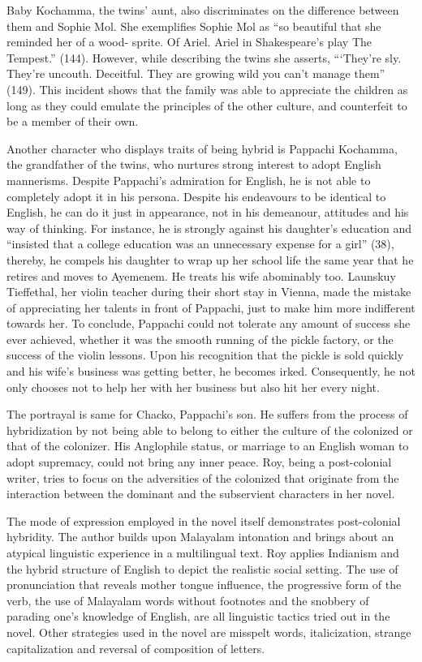Baby Kochamma, the twins’ aunt, also discriminates on the difference between them and Sophie Mol. She exemplifies Sophie Mol as “so beautiful that she reminded her of a wood- sprite. Of Ariel. Ariel in Shakespeare’s play The Tempest.” (144). However, while describing the twins she asserts, “‘They’re sly. They’re uncouth. Deceitful. They are growing wild you can’t manage them” (149). This incident shows that the family was able to appreciate the children as long as they could emulate the principles of the other culture, and counterfeit to be a member of their own. 

Another character who displays traits of being hybrid is Pappachi Kochamma, the grandfather of the twins, who nurtures strong interest to adopt English mannerisms.  Despite Pappachi’s admiration for English, he is not able to completely adopt it in his persona. Despite his endeavours to be identical to English, he can do it just in appearance, not in his demeanour, attitudes and his way of thinking. For instance, he is strongly against his daughter’s education and “insisted that a college education was an unnecessary expense for a girl” (38), thereby, he compels his daughter to wrap up her school life the same year that he retires and moves to Ayemenem. He treats his wife abominably too. Launskuy Tieffethal, her violin teacher during their short stay in Vienna, made the mistake of appreciating her talents in front of Pappachi, just to make him more indifferent towards her. To conclude, Pappachi could not tolerate any amount of success she ever achieved, whether it was the smooth running of the pickle factory, or the success of the violin lessons. Upon his recognition that the pickle is sold quickly and his wife’s business was getting better, he becomes irked. Consequently, he not only chooses not to help her with her business but also hit her every night. 

The portrayal is same for Chacko, Pappachi’s son. He suffers from the process of hybridization by not being able to belong to either the culture of the colonized or that of the colonizer. His Anglophile status, or marriage to an English woman to adopt supremacy, could not bring any inner peace. Roy, being a post-colonial writer, tries to focus on the adversities of the colonized that originate from the interaction between the dominant and the subservient characters in her novel. 

The mode of expression employed in the novel itself demonstrates post-colonial hybridity. The author builds upon Malayalam intonation and brings about an atypical linguistic experience in a multilingual text. Roy applies Indianism and the hybrid structure of English to depict the realistic social setting. The use of pronunciation that reveals mother tongue influence, the progressive form of the verb, the use of Malayalam words without footnotes and the snobbery of parading one’s knowledge of English, are all linguistic tactics tried out in the novel. Other strategies used in the novel are misspelt words, italicization, strange capitalization and reversal of composition of letters. 

